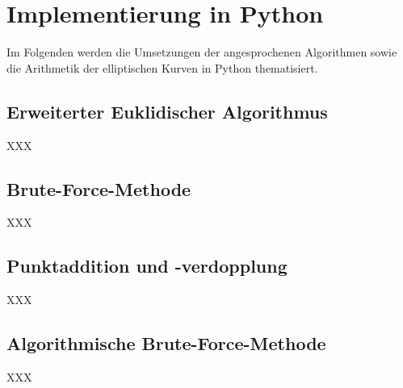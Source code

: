 \chapter{Implementierung in Python}
Im Folgenden werden die Umsetzungen der angesprochenen Algorithmen sowie die Arithmetik der elliptischen Kurven in Python thematisiert.

\section{Erweiterter Euklidischer Algorithmus}\label{sec:python_euklid}
XXX


\section{Brute-Force-Methode}\label{sec:python_brute_force}
XXX

\section{Punktaddition und -verdopplung}\label{sec:python_add_double}
XXX

\section{Algorithmische Brute-Force-Methode}\label{sec:python_algo_brute_force}
XXX